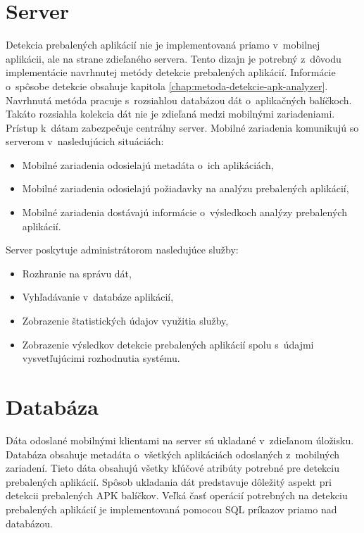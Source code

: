 \section{Server}
Detekcia prebalených aplikácií nie je implementovaná priamo v~mobilnej aplikácii, ale na strane zdieľaného servera. Tento dizajn je potrebný z~dôvodu implementácie navrhnutej metódy detekcie prebalených aplikácií. Informácie o~spôsobe detekcie obsahuje kapitola \ref{chap:metoda-detekcie-apk-analyzer}. Navrhnutá metóda pracuje s~rozsiahlou databázou dát o~aplikačných balíčkoch. Takáto rozsiahla kolekcia dát nie je zdieľaná medzi mobilnými zariadeniami. Prístup k~dátam zabezpečuje centrálny server. 
\newline
\noindent Mobilné zariadenia komunikujú so serverom v~nasledujúcich situáciách:
\begin{itemize}
	\item Mobilné zariadenia odosielajú metadáta o~ich aplikáciách,
	\item Mobilné zariadenia odosielajú požiadavky na analýzu prebalených aplikácií,
	\item Mobilné zariadenia dostávajú informácie o~výsledkoch analýzy prebalených aplikácií.
\end{itemize}
Server poskytuje administrátorom nasledujúce služby:
\begin{itemize}
	\item Rozhranie na správu dát,
	\item Vyhľadávanie v~databáze aplikácií,
	\item Zobrazenie štatistických údajov využitia služby,
	\item Zobrazenie výsledkov detekcie prebalených aplikácií spolu s~údajmi vysvetľujúcimi rozhodnutia systému.
\end{itemize}

\section{Databáza}
Dáta odoslané mobilnými klientami na server sú ukladané v~zdieľanom úložisku. Databáza obsahuje metadáta o~všetkých aplikáciách odoslaných z~mobilných zariadení. Tieto dáta obsahujú všetky kľúčové atribúty potrebné pre detekciu prebalených aplikácií. Spôsob ukladania dát predstavuje dôležitý aspekt pri detekcii prebalených APK balíčkov. Veľká časť operácií potrebných na detekciu prebalených aplikácií je implementovaná pomocou SQL príkazov priamo nad databázou. 